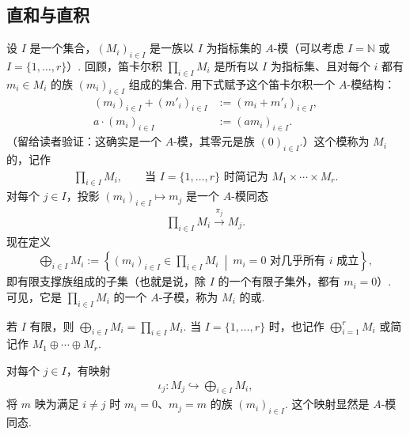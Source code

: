 \subsection{直和与直积}\label{sec:galois-1-3-4}
设 $I$ 是一个集合，$(M_i)_{i\in I}$ 是一族以 $I$ 为指标集的 $A$-模（可以考虑 $I=\mathbb N$ 或 $I=\{1,\ldots,r\}$）. 回顾，笛卡尔积 $\prod_{i\in I}M_i$ 是所有以 $I$ 为指标集、且对每个 $i$ 都有 $m_i\in M_i$ 的族 $(m_i)_{i\in I}$ 组成的集合. 用下式赋予这个笛卡尔积一个 $A$-模结构：
\begin{align*}
 (m_i)_{i\in I}+(m'_i)_{i\in I}&:=(m_i+m'_i)_{i\in I},\\
 a\cdot(m_i)_{i\in I}&:=(am_i)_{i\in I}.
\end{align*}
（留给读者验证：这确实是一个 $A$-模，其零元是族 $(0)_{i\in I}$.）这个模称为 $M_i$ 的，记作
\begin{align*}
 \prod_{i\in I}M_i,\qquad\text{当 }I=\{1,\ldots,r\}\text{ 时简记为 }M_1\times\cdots\times M_r.
\end{align*}
对每个 $j\in I$，投影 $(m_i)_{i\in I}\longmapsto m_j$ 是一个 $A$-模同态
\begin{align*}
 \prod_{i\in I}M_i\xrightarrow{\pi_j}M_j.
\end{align*}
现在定义
\begin{align*}
 \bigoplus_{i\in I}M_i:=\left\{(m_i)_{i\in I}\in\prod_{i\in I}M_i\ \middle|\ m_i=0\text{ 对几乎所有 }i\text{ 成立}\right\},
\end{align*}
即有限支撑族组成的子集（也就是说，除 $I$ 的一个有限子集外，都有 $m_i=0$）. 可见，它是 $\prod_{i\in I}M_i$ 的一个 $A$-子模，称为 $M_i$ 的或.
\begin{remark*}
若 $I$ 有限，则 $\bigoplus_{i\in I}M_i=\prod_{i\in I}M_i$. 当 $I=\{1,\ldots,r\}$ 时，也记作 $\bigoplus_{i=1}^rM_i$ 或简记作 $M_1\oplus\cdots\oplus M_r$.
\end{remark*}
对每个 $j\in I$，有映射
\begin{align*}
 \iota_j\colon M_j\hookrightarrow\bigoplus_{i\in I}M_i,
\end{align*}
将 $m$ 映为满足 $i\ne j$ 时 $m_i=0$、$m_j=m$ 的族 $(m_i)_{i\in I}$. 这个映射显然是 $A$-模同态.

